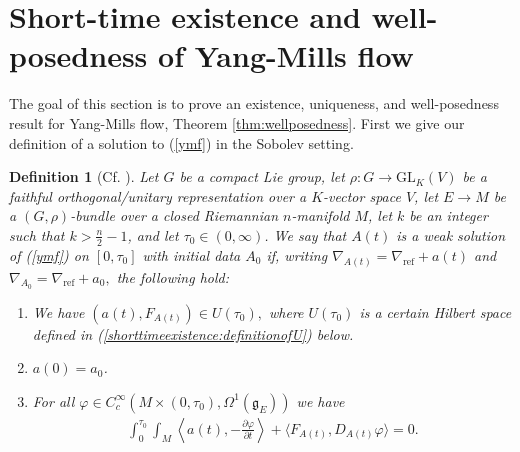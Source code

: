 \documentclass[12pt]{amsart}
\renewcommand{\1}{{\mathbf 1}}
\newcommand{\GL}{{\mathrm{GL} }}
\theoremstyle{others}
\newtheorem{defn}[thm]{Definition}
\numberwithin{equation}{section}
\begin{document}
\vspace{10mm}


\appendix





\section{Short-time existence and well-posedness of Yang-Mills flow}

  The goal of this section is to prove an existence, uniqueness, and well-posedness result for Yang-Mills flow, Theorem \ref{thm:wellposedness}. First we give our definition of a solution to (\ref{ymf}) in the Sobolev setting.

\begin{defn}[Cf. {\cite[Def. 2.1]{struweym}}]
Let $G$ be a compact Lie group, let $
\rho : G \to \GL_K(V)$ be a faithful orthogonal/unitary representation over a $K$-vector space $V$, let \(E \to M\) be a \((G, \rho)\)-bundle over a closed Riemannian \(n\)-manifold \(M\), let \(k\) be an integer such that \(k > \frac{n}{2}-1\), and let \(\tau_0 \in (0, \infty)\). We say that \(A(t)\) is a weak solution of (\ref{ymf}) on \([0, \tau_0]\) with initial data \(A_0\) if, writing $\nabla_{A(t)} = \nabla_{\text{ref}} + a(t)$ and $\nabla_{A_0} = \nabla_{\text{ref}} + a_0,$ the following hold:
\begin{enumerate}
    \item We have \(\left(a(t), F_{A(t)}\right) \in U(\tau_0),\) where \(U(\tau_0)\) is a certain Hilbert space defined in (\ref{shorttimeexistence:definitionofU}) below.
\item \(a(0) = a_0\).
\item  For all \(\varphi \in C_c^\infty(M \times (0, \tau_0), \Omega^1(\mathfrak{g}_E))\) we have
\begin{align*}
    \int_0^{\tau_0} \int_M \left\langle a(t), -\frac{\partial \varphi}{\partial t}\right\rangle +\langle F_{A(t)}, D_{A(t)} \varphi\rangle = 0.
\end{align*}
\end{enumerate}
\end{defn}
 
\end{document}
